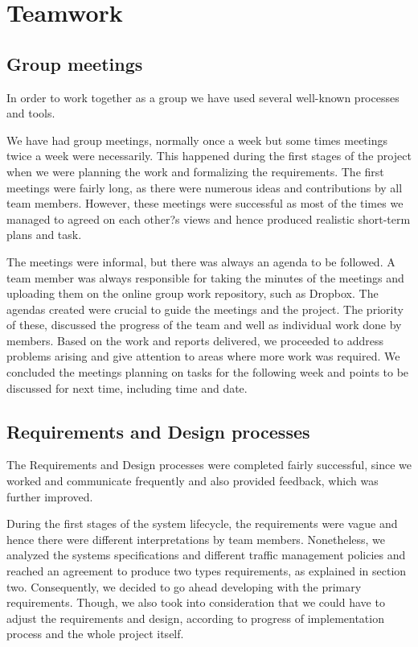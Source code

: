 \section{Teamwork}

 \subsection{Group meetings}
 
 In order to work together as a group we have used several well-known processes and tools.\newline
 
We have had group meetings, normally once a week but some times meetings twice a week were necessarily. This happened during the first stages of the project when we were planning the work and formalizing the requirements. The first meetings were fairly long, as there were numerous ideas and contributions by all team members. However, these meetings were successful as most of the times we managed to agreed on each other?s views and hence produced realistic short-term plans and task. \newline
 
The meetings were informal, but there was always an agenda to be followed. A team member was always responsible for taking the minutes of the meetings and uploading them on the online group work repository, such as Dropbox. The agendas created were crucial to guide the meetings and the project. The priority of these, discussed the progress of the team and well as individual work done by members. Based on the work and reports delivered, we proceeded to address problems arising and give attention to areas where more work was required. We concluded the meetings planning on tasks for the following week and points to be discussed for next time, including time and date.

 \subsection{Requirements and Design processes}
 The Requirements and Design processes were completed fairly successful, since we worked and communicate frequently and also provided feedback, which was further improved.\newline
 
During the first stages of the system lifecycle, the requirements were vague and hence there were different interpretations by team members. Nonetheless, we analyzed the systems specifications and different traffic management policies and reached an agreement to produce two types requirements, as explained in section two. Consequently, we decided to go ahead developing with the primary requirements. Though, we also took into consideration that we could have to adjust the requirements and design, according to progress of implementation process and the whole project itself. \newline
 
